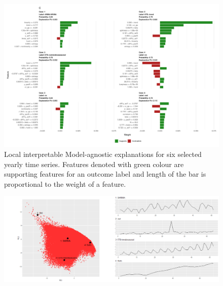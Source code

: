 \documentclass[11pt,a4paper,]{article}
\begin{document}
\begin{figure}[h]

{\centering \includegraphics{figures/yearlylime2-1} 

}

\caption{Local interpretable Model-agnostic explanations for six selected yearly time series. Features denoted with green colour are supporting features for an outcome label and length of the bar is proportional to the weight of a feature.}\label{fig:yearlylime2}
\end{figure}

\clearpage

\begin{figure}[h]

{\centering \includegraphics{figures/quarterlylime-1} 

}

\end{figure}
\end{document}
